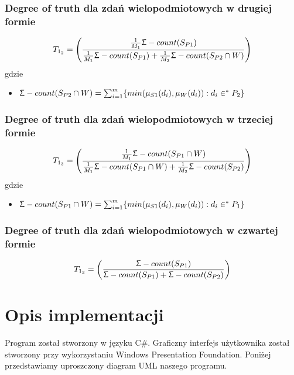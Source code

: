 \documentclass{classrep}
\begin{document}
\subsubsection{Degree of truth dla zdań wielopodmiotowych w drugiej formie \cite{anbookpl}} 
\begin{equation}
T_{1_2} = \left(\frac{\frac{1}{M_1} \Upsigma-count(S_{P1})}
				{\frac{1}{M_1} \Upsigma-count(S_{P1}) + \frac{1}{M_2} \Upsigma-count(S_{P2} \cap W )}\right)
\end{equation}
gdzie 
\begin{itemize}
	\item  $\Upsigma-count(S_{P2} \cap W ) = \sum_{i=1}^{m} \{min(\mu_{S1}(d_i), \mu_{W}(d_i)) : d_i \in^* P_2 \}  $
\end{itemize}
\subsubsection{Degree of truth dla zdań wielopodmiotowych w trzeciej formie \cite{anbookpl}} 
\begin{equation}
T_{1_3} = \left(\frac{\frac{1}{M_1} \Upsigma-count(S_{P1} \cap W)}
				{\frac{1}{M_1} \Upsigma-count(S_{P1} \cap W) + \frac{1}{M_2} \Upsigma-count(S_{P2} )}\right)
\end{equation}
gdzie 
\begin{itemize}
	\item  $\Upsigma-count(S_{P1} \cap W ) = \sum_{i=1}^{m} \{min(\mu_{S1}(d_i), \mu_{W}(d_i)) : d_i \in^* P_1 \}  $
\end{itemize}
\subsubsection{Degree of truth dla zdań wielopodmiotowych w czwartej formie \cite{anarticle30}} 
\begin{equation}
T_{1_3} = \left(\frac{\Upsigma-count(S_{P1})}
			{\Upsigma-count(S_{P1}) + \Upsigma-count(S_{P2})}\right)
\end{equation}


	\newpage
	\section{Opis implementacji} %
	Program został stworzony w języku C\#. Graficzny interfejs użytkownika został stworzony przy wykorzystaniu Windows Presentation Foundation. Poniżej przedstawiamy uproszczony diagram UML naszego programu.
	
\end{document}
